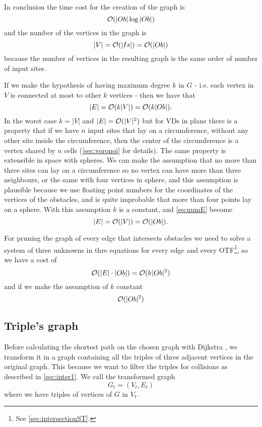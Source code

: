 \documentclass[dissertation.tex]{subfiles}
\begin{document}
In conclusion the time cost for the creation of the graph
is
\newcommand{\eqCostGraph}{\ensuremath{\bigO(|Ob|\log |Ob|)}}
\begin{equation}
  \label{eq:costGraph}
  \eqCostGraph
\end{equation}
and the number of the vertices in the graph
is 
\begin{equation}
  \label{eq:numV}
  |V|=\mathcal{O}(|Is|)=\mathcal{O}(|Ob|)
\end{equation}
because the number of vertices in the resulting graph is the
same order of number of input sites.

If we make the hypothesis of having maximum degree $k$ in $G$ -
i.e. each vertex in $V$ is connected at most to other $k$ vertices -
then we have that
\begin{equation}
  \label{eq:numE}
  |E|=\mathcal{O}(k|V|)=\mathcal{O}(k|Ob|).
\end{equation}
In the worst case $k=|V|$ and $|E|=\mathcal{O}(|V|^2)$ but for \acp{VD} in
plane there is a property that if we have $n$ input sites
that lay on a circumference, without any other site inside the
circumference, then the center of the circumference is a vertex shared
by $n$ cells (\cref{sec:voronoi} for details). The same property is
extensible in space with
spheres. We can make the assumption that no more than three sites can lay
on a circumference so no vertex can have more than three neighbours,
or the same with four vertices in sphere, and this assumption is
plausible because we use floating point numbers for the coordinates of
the vertices of the obstacles, and is quite improbable that more than
four points lay on a sphere. With this assumption $k$ is a constant,
and \cref{eq:numE} become
\begin{equation*}
  |E|=\mathcal{O}(|V|)=\mathcal{O}(|Ob|).
\end{equation*}

For pruning the graph of every edge that intersects obstacles we need
to solve a system of three unknowns in thre equations for every edge
and every \ac{OTF}\footnote{See \cref{sec:intersectionST}.}, so
we have a cost of
\newcommand{\eqCostPruning}{\ensuremath{\bigO(k|Ob|^2)}}
\begin{equation}
  \label{eq:costPruning}
  \bigO(|E|\cdot|Ob|)=\eqCostPruning
\end{equation}
and if we make the assumption of $k$ constant
\begin{equation*}
  \mathcal{O}(|Ob|^2)
\end{equation*}

\subsection{Triple's graph}\label{sec:trigraph}
Before calculating the shortest path on the chosen graph with Dijkstra
\cite{dijkstra}\cite{knuth}, we
transform it in a graph containing all the triples
of three adjacent vertices in the original graph. This because we want
to filter the triples for collisions as described in
\cref{sec:inter1}. We call the transformed graph
$$G_t=(V_t,E_t)$$
where we have triples of vertices of $G$ in $V_t$.
\end{document}
